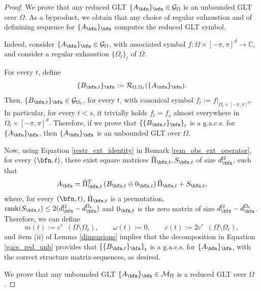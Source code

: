 \documentclass{amsart}
\DeclareMathOperator{\Ld}{\mathcal{L}^d}
\begin{document}
\begin{proof}
     We prove that any reduced GLT $\{A_\bfn\}_\bfn\in\mathcal{G}_\Omega$ is an unbounded GLT over $\Omega$. As a byproduct, we obtain that any choice of regular exhaustion and of definining sequence for $\{A_\bfn\}_\bfn$ computes the reduced GLT symbol.

    Indeed, consider $\{A_\bfn\}_\bfn\in\mathcal{G}_\Omega$, with associated symbol $f:\Omega\times[-\pi,\pi]^d\to\mathbb{C}$, and consider a regular exhaustion $\{\Omega_t\}_t$ of $\Omega$. 

    For every $t$, define
    \begin{equation*}
        \{B_{\bfn,t}\}_\bfn:=\mathcal{R}_{\Omega,\Omega_t}(\{A_\bfn\}_\bfn).
    \end{equation*}
    Then, $\{B_{\bfn,t}\}_\bfn\in\mathcal{G}_{\Omega_t}$, for every $t$, with canonical symbol $f_t:=f|_{\Omega_t\times[-\pi,\pi]^d}$. In particular, for every $t<s$, it trivially holds $f_t=f_s$ almost everywhere in $\Omega_t\times[-\pi,\pi]^d$. Therefore, if we prove that $\left\{\{B_{\bfn,t}\}_\bfn\right\}_t$ is a $\mathrm{g.a.c.s.}$ for $\{A_\bfn\}_\bfn$, then $\{A_\bfn\}_\bfn$ is an unbounded GLT over $\Omega$.
    
    Now, using Equation \eqref{restr_ext_identity} in Remark \ref{rem_obs_ext_operator}, for every $(\bfn,t)$, there exist square matrices $\tilde{\Pi}_{\bfn,t},S_{\bfn,t}$ of size $d_\bfn^{\Omega}$, such that 
    \begin{equation}\label{gacs_red_unb}
        A_\bfn=\tilde{\Pi}_{\bfn,t}^{T}\left(B_{\bfn,t}\oplus0_{\bfn,t}\right)\tilde{\Pi}_{\bfn,t}+S_{\bfn,t},
    \end{equation}
    where, for every $(\bfn,t)$, $\tilde{\Pi}_{\bfn,t}$ is a permutation, $\mathrm{rank}(S_{\bfn,t})\leq2(d_\bfn^{\Omega}-d_\bfn^{\Omega_t})$ and $0_{\bfn,t}$ is the zero matrix of size $d_\bfn^{\Omega}-d_\bfn^{\Omega_t}$.
    Therefore, we can define 
    \begin{equation*}
        m(t):=c'\Ld(\Omega\setminus\Omega_t),\qquad \omega(t):=0,\qquad c(t):=2c'\Ld(\Omega\setminus\Omega_t),
    \end{equation*}
    and item (ii) of Lemma \ref{dimensions} implies that the decomposition in Equation \eqref{gacs_red_unb} provides that $\left\{\{B_{\bfn,t}\}_\bfn\right\}_t$ is a $\mathrm{g.a.c.s.}$ for $\{A_\bfn\}_\bfn$, with the correct structure matrix-sequences, as desired. 

     We prove that any unbounded GLT $\{A_\bfn\}_\bfn\in\mathcal{M}_\Omega$ is a reduced GLT over $\Omega$. 
    

\end{proof}
\end{document}
